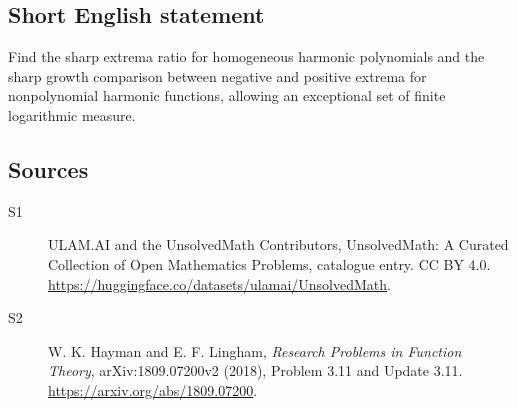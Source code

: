 \documentclass[11pt]{article}
\begin{document}
\subsection{Short English statement}
Find the sharp extrema ratio for homogeneous harmonic polynomials and the sharp growth comparison between negative and positive extrema for nonpolynomial harmonic functions, allowing an exceptional set of finite logarithmic measure.
\subsection{Sources}
\begin{description}
\item[\hypertarget{source:statement:1}{S1}] ULAM.AI and the UnsolvedMath Contributors, UnsolvedMath: A Curated Collection of Open Mathematics Problems, catalogue entry. CC BY 4.0. \url{https://huggingface.co/datasets/ulamai/UnsolvedMath}.
\item[\hypertarget{source:statement:2}{S2}] W. K. Hayman and E. F. Lingham, \emph{Research Problems in Function Theory}, arXiv:1809.07200v2 (2018), Problem 3.11 and Update 3.11. \url{https://arxiv.org/abs/1809.07200}.
\end{description}
\label{end:statement}
\end{document}
